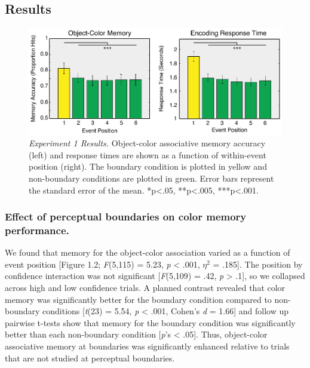 \subsection{Results}\label{results}

\begin{figure}
  \centering
  \includegraphics[width=\textwidth]{figures/chapter1_figure2.eps}
  \caption[Behavioral experiment 1 results]{\textit{Experiment 1 Results.} Object-color associative memory accuracy (left) and response times are shown as a function of within-event position (right).  The boundary condition is plotted in yellow and non-boundary conditions are plotted in green.  Error bars represent the standard error of the mean. *p<.05, **p<.005, ***p<.001.}
  \label{chapter1_figure2}
\end{figure}

\subsubsection{Effect of perceptual boundaries on color memory
performance.}\label{effect-of-perceptual-boundaries-on-color-memory-performance.}

We found that memory for the object-color association varied as a
function of event position {[}Figure 1.2; \emph{F}(5,115) = 5.23,
\emph{p} \textless{} .001, \(\eta^{2}\) = .185{]}. The position by
confidence interaction was not significant {[}\emph{F}(5,109) = .42,
\emph{p} \textgreater{} .1{]}, so we collapsed across high and low
confidence trials. A planned contrast revealed that color memory was
significantly better for the boundary condition compared to non-boundary
conditions {[}\emph{t}(23) = 5.54, \emph{p} \textless{} .001, Cohen's
\emph{d} = 1.66{]} and follow up pairwise t-tests show that memory for
the boundary condition was significantly better than each non-boundary
condition {[}\emph{p}'s \textless{} .05{]}. Thus, object-color
associative memory at boundaries was significantly enhanced relative to
trials that are not studied at perceptual boundaries.

